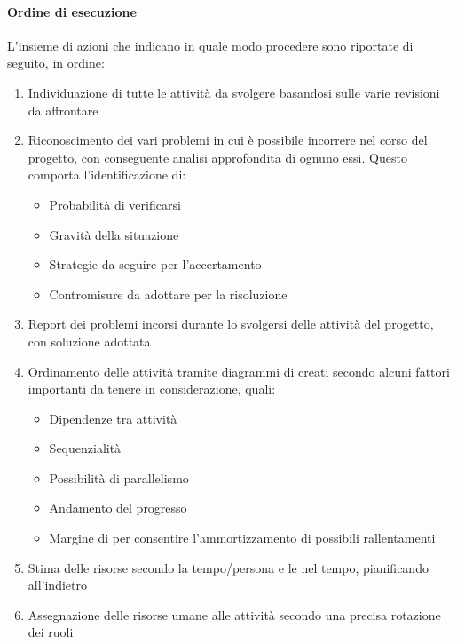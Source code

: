 			\paragraph{Ordine di esecuzione}
			L'insieme di azioni che indicano in quale modo procedere sono riportate di seguito, in ordine:
			\begin{enumerate}
				\item Individuazione di tutte le attività da svolgere basandosi sulle varie revisioni da affrontare
				\item Riconoscimento dei vari problemi in cui è possibile incorrere nel corso del progetto, con conseguente analisi
					approfondita di ognuno essi. Questo comporta l'identificazione di:
				\begin{itemize}
					\item Probabilità di verificarsi
					\item Gravità della situazione
					\item Strategie da seguire per l'accertamento
					\item Contromisure da adottare per la risoluzione
				\end{itemize}
				\item Report dei problemi incorsi durante lo svolgersi delle attività del progetto, con soluzione adottata
				\item Ordinamento delle attività tramite diagrammi di  creati secondo alcuni fattori importanti da tenere
				in considerazione, quali:
				\begin{itemize}
					\item Dipendenze tra attività
					\item Sequenzialità
					\item Possibilità di parallelismo
					\item Andamento del progresso
					\item Margine di  per consentire l'ammortizzamento di possibili rallentamenti
				\end{itemize}
			\item Stima delle risorse secondo la  tempo/persona e le  nel tempo, pianificando all'indietro
			\item Assegnazione delle risorse umane alle attività secondo una precisa rotazione dei ruoli
			\end{enumerate}

